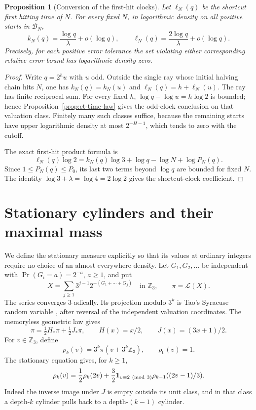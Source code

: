 \documentclass[11pt,a4paper]{article}
\newtheorem{proposition}[theorem]{Proposition}
\begin{document}
\begin{proposition}[Conversion of the first-hit clocks]
\label{prop:ct-clock-conversion}
Let \(\ell_N(q)\) be the shortcut first hitting time of \(N\).
For every fixed \(N\), in logarithmic density on all positive starts
in \(\mathcal B_N\),
\[
 k_N(q)=\frac{\log q}{\lambda}+o(\log q),\qquad
 \ell_N(q)=\frac{2\log q}{\lambda}+o(\log q).
\]
Precisely, for each positive error tolerance the set violating either
corresponding relative error bound has logarithmic density zero.
\end{proposition}
\begin{proof}
Write \(q=2^hu\) with \(u\) odd. Outside the single ray whose
initial halving chain hits \(N\), one has
\(k_N(q)=k_N(u)\) and \(\ell_N(q)=h+\ell_N(u)\).
The ray has finite reciprocal sum. For every fixed \(h\),
\(\log q-\log u=h\log2\) is bounded; hence
Proposition~\ref{prop:ct-time-law} gives the odd-clock conclusion
on that valuation class. Finitely many such classes suffice,
because the remaining starts have upper logarithmic density at most
\(2^{-H-1}\), which tends to zero with the cutoff.

The exact first-hit product formula is
\[
 \ell_N(q)\log2
 =k_N(q)\log3+\log q-\log N+\log P_N(q).
\]
Since \(1\le P_N(q)\le P_0\), its last two terms beyond
\(\log q\) are bounded for fixed \(N\).
The identity \(\log3+\lambda=\log4=2\log2\) gives the
shortcut-clock coefficient.
\end{proof}

\section{Stationary cylinders and their maximal mass}

We define the stationary measure explicitly so that its values at
ordinary integers require no choice of an almost-everywhere density.
Let \(G_1,G_2,\ldots\) be independent with
\(\Pr(G_i=a)=2^{-a}\), \(a\ge1\), and put
\begin{equation}\label{eq:ct-pi-series}
 X=\sum_{j\ge1}3^{j-1}2^{-(G_1+\cdots+G_j)}
       \quad\text{in }\mathbb Z_3,\qquad \pi=\mathcal L(X).
\end{equation}
The series converges \(3\)-adically. Its projection modulo \(3^k\)
is Tao's Syracuse random variable
\cite[Section~1.4, equations~(1.22)--(1.24)]{Tao2022},
after reversal of the independent valuation coordinates.
The memoryless geometric law gives
\[
 \pi=\tfrac12 H_*\pi+\tfrac12 J_*\pi,\qquad
 H(x)=x/2,\qquad J(x)=(3x+1)/2.
\]
For \(v\in\mathbb Z_3\), define
\begin{equation}\label{eq:ct-rho}
 \rho_k(v)=3^k\pi(v+3^k\mathbb Z_3),\qquad \rho_0(v)=1.
\end{equation}
The stationary equation gives, for \(k\ge1\),
\begin{equation}\label{eq:ct-cylinder-recursion}
 \rho_k(v)=\frac12\rho_k(2v)
       +\frac32\mathbf1_{v\equiv2\ ({\rm mod}\ 3)}
                           \rho_{k-1}((2v-1)/3).
\end{equation}
Indeed the inverse image under \(J\) is empty outside its unit
class, and in that class a depth-\(k\) cylinder pulls back to a
depth-\((k-1)\) cylinder.
\end{document}
